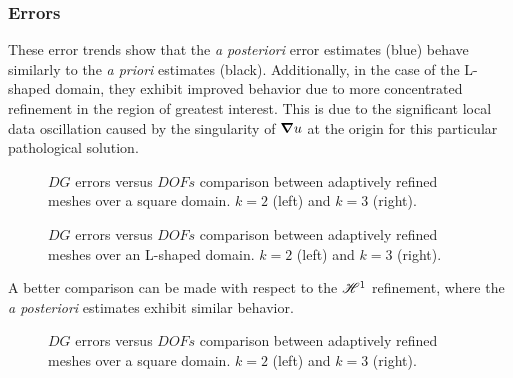 \newpage
\subsubsection{Errors}

These error trends show that the \textit{a posteriori} error estimates (blue) behave similarly to the \textit{a priori} estimates (black). Additionally, in the case of the L-shaped domain, they exhibit improved behavior due to more concentrated refinement in the region of greatest interest. This is due to the significant local data oscillation caused by the singularity of $\bm{\nabla} u$ at the origin for this particular pathological solution.

\begin{figure}[!ht]
	\begin{subfigure}[b]{0.45\textwidth}
		
	\end{subfigure}
	\hfill
	\begin{subfigure}[b]{0.45\textwidth}
		
	\end{subfigure}
    \caption{$DG$ errors versus $DOFs$ comparison between adaptively refined meshes over a square domain. $k = 2$ (left) and $k = 3$ (right).}
\end{figure}

\begin{figure}[!ht]
	\begin{subfigure}[b]{0.45\textwidth}
		
	\end{subfigure}
	\hfill
	\begin{subfigure}[b]{0.45\textwidth}
	\end{subfigure}
    \caption{$DG$ errors versus $DOFs$ comparison between adaptively refined meshes over an L-shaped domain. $k = 2$ (left) and $k = 3$ (right).}
\end{figure}

\newpage

A better comparison can be made with respect to the $\mathscr{H}^1$ refinement, where the \textit{a posteriori} estimates exhibit similar behavior.

\begin{figure}[!ht]
	\begin{subfigure}[b]{0.45\textwidth}
		
	\end{subfigure}
	\hfill
	\begin{subfigure}[b]{0.45\textwidth}
		
	\end{subfigure}
    \caption{$DG$ errors versus $DOFs$ comparison between adaptively refined meshes over a square domain. $k = 2$ (left) and $k = 3$ (right).}
\end{figure}

